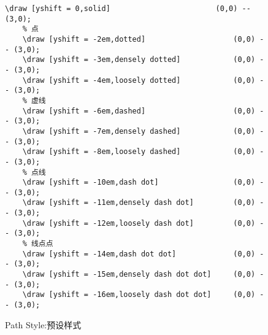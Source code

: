 \begin{itemize}
    \begin{figure}[H]
        \centering
        \begin{minipage}{0.3\linewidth}
            \centering
        \end{minipage}
        \begin{minipage}{0.6\linewidth}
            \begin{lstlisting}[style = latex-side]
    \draw [yshift = 0,solid]                        (0,0) -- (3,0);
    % 点
    \draw [yshift = -2em,dotted]                    (0,0) -- (3,0);
    \draw [yshift = -3em,densely dotted]            (0,0) -- (3,0);
    \draw [yshift = -4em,loosely dotted]            (0,0) -- (3,0);
    % 虚线            
    \draw [yshift = -6em,dashed]                    (0,0) -- (3,0);
    \draw [yshift = -7em,densely dashed]            (0,0) -- (3,0);
    \draw [yshift = -8em,loosely dashed]            (0,0) -- (3,0);
    % 点线
    \draw [yshift = -10em,dash dot]                 (0,0) -- (3,0);
    \draw [yshift = -11em,densely dash dot]         (0,0) -- (3,0);
    \draw [yshift = -12em,loosely dash dot]         (0,0) -- (3,0);
    % 线点点
    \draw [yshift = -14em,dash dot dot]             (0,0) -- (3,0);
    \draw [yshift = -15em,densely dash dot dot]     (0,0) -- (3,0);
    \draw [yshift = -16em,loosely dash dot dot]     (0,0) -- (3,0);
            \end{lstlisting}
        \end{minipage}
        \caption{Path Style:预设样式}
    \end{figure}

\end{itemize}

